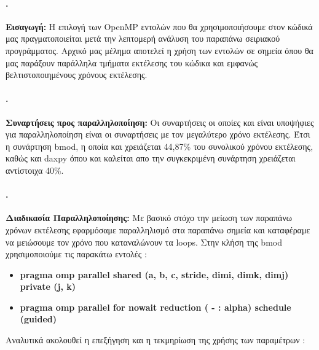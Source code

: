 \documentclass[greek,booktabs,8pt,flagBlueCMYK]{report}
\begin{document}
\paragraph{.} \textbf{Εισαγωγή:}\newline
Η επιλογή των OpenMP εντολών που θα χρησιμοποιήσουμε στον κώδικά μας πραγματοποιείται μετά την λεπτομερή ανάλυση του παραπάνω σειριακού προγράμματος.
Αρχικό μας μέλημα αποτελεί η χρήση των εντολών σε σημεία όπου θα μας παράξουν παράλληλα τμήματα εκτέλεσης του κώδικα και εμφανώς βελτιστοποιημένους χρόνους εκτέλεσης.
\paragraph{.} \textbf{Συναρτήσεις προς παραλληλοποίηση:}\newline
Οι συναρτήσεις οι οποίες και είναι υποψήφιες για παραλληλοποίηση είναι οι συναρτήσεις με τον μεγαλύτερο χρόνο εκτέλεσης. Έτσι η συνάρτηση bmod, 
η οποία και χρειάζεται 44,87\% του συνολικού χρόνου εκτέλεσης, καθώς και daxpy όπου και καλείται απο την συγκεκριμένη συνάρτηση χρειάζεται αντίστοιχα 40\%. 

\paragraph{.} \textbf{Διαδικασία Παραλληλοποίησης:}\newline
Με βασικό στόχο την μείωση των παραπάνω χρόνων εκτέλεσης εφαρμόσαμε παραλληλισμό στα παραπάνω σημεία και καταφέραμε να μειώσουμε τον χρόνο που καταναλώνουν τα loops. \newline
\FloatBarrier
Στην κλήση της bmod χρησιμοποιούμε τις παρακάτω εντολές :
\begin{itemize}
  \item \bf{pragma omp parallel shared (a, b, c, stride, dimi, dimk, dimj) private (j, k)}
  \item \bf{pragma omp parallel for nowait reduction ( - : alpha) schedule (guided)}
\end{itemize}
Αναλυτικά ακολουθεί η επεξήγηση και η τεκμηρίωση της χρήσης των παραμέτρων :
\end{document}
